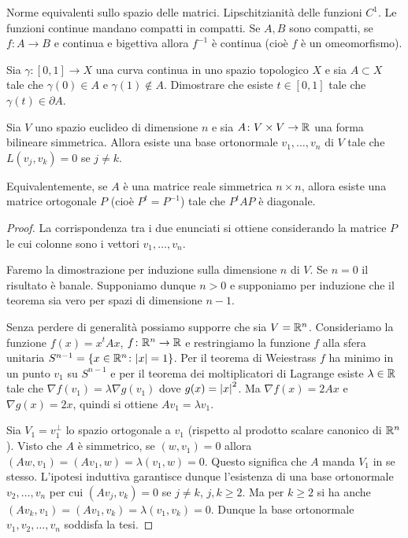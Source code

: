 


Norme equivalenti sullo spazio delle matrici. Lipschitzianità delle funzioni $C^1$.
Le funzioni continue mandano compatti in compatti.
Se $A,B$ sono compatti, se $f\colon A\to B$ e continua e bigettiva allora 
$f^{-1}$ è continua (cioè $f$ è un omeomorfismo).



\begin{exercise}
  \label{ex:punto-di-frontiera}
Sia $\gamma\colon [0,1] \to X$ una curva continua in uno 
spazio topologico $X$ e sia $A\subset X$ tale che 
$\gamma(0)\in A$ e $\gamma(1)\notin A$.
Dimostrare che esiste $t \in [0,1]$ tale che $\gamma(t) \in \partial A$.
\end{exercise}



\begin{theorem}
Sia $V$ uno spazio euclideo di dimensione $n$ e sia 
$A\colon V\times V \to {\mathbb R}$ 
una forma bilineare simmetrica.
Allora esiste una base ortonormale $v_1,\dots,v_n$ di $V$
tale che $L(v_j,v_k) = 0$ se $j\neq k$. 

Equivalentemente, se $A$ è una matrice reale simmetrica $n\times n$,
allora esiste una matrice ortogonale $P$ (cioè $P^t=P^{-1}$) tale che
$P^t A P$ è diagonale.
\end{theorem}
%
\begin{proof}
La corrispondenza tra i due enunciati si ottiene 
considerando la matrice $P$ le cui colonne sono i vettori
$v_1,\dots,v_n$.

Faremo la dimostrazione per induzione sulla dimensione $n$ di $V$.
Se $n=0$ il risultato è banale. 
Supponiamo dunque $n>0$ e supponiamo per induzione che il teorema sia vero
per spazi di dimensione $n-1$.

Senza perdere di generalità possiamo supporre che sia $V = {\mathbb R}^n$.
Consideriamo la funzione $f(x) = x^t A x$, $f\colon {\mathbb R}^n\to {\mathbb R}$ e restringiamo 
la funzione $f$ alla sfera unitaria $S^{n-1} = \{ x \in {\mathbb R}^n \colon {\left|x\right|} = 1\}$.
Per il teorema di Weiestrass $f$ ha minimo in un punto $v_1$ su $S^{n-1}$ 
e per il teorema dei moltiplicatori di Lagrange
esiste $\lambda \in {\mathbb R}$ tale che $\nabla f(v_1) = \lambda \nabla g(v_1)$
dove $g(x) = {\left|x\right|}^2$. Ma $\nabla f(x) = 2 A x$ e $\nabla g(x) = 2 x$, quindi si ottiene
$A v_1 = \lambda v_1$.

Sia $V_1 = v_1^\perp$ lo spazio ortogonale a $v_1$ (rispetto al prodotto scalare canonico di ${\mathbb R}^n$).
Visto che $A$ è simmetrico, se $(w,v_1)=0$ allora 
$(Aw,v_1) = (Av_1,w) = \lambda (v_1,w) = 0$.
Questo significa che $A$ manda $V_1$ in se stesso.
L'ipotesi induttiva garantisce dunque l'esistenza di una base ortonormale 
$v_2,\dots,v_n$ per cui $(Av_j,v_k) = 0$ se $j\neq k$, $j,k\ge 2$.
Ma per $k\ge 2$ si ha anche $(Av_k,v_1) = (Av_1,v_k) = \lambda (v_1,v_k) = 0$.
Dunque la base ortonormale $v_1, v_2,\dots,v_n$ soddisfa la tesi.
\end{proof}


